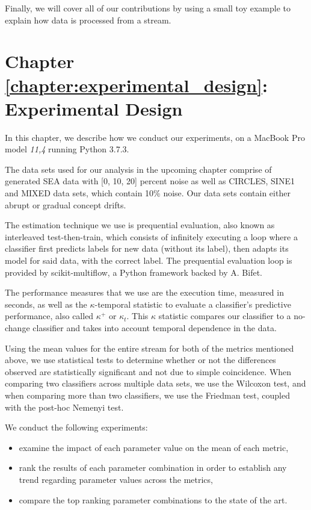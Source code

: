 Finally, we will cover all of our contributions by using a small toy example to explain how data is processed from a stream.

\section{Chapter \ref{chapter:experimental_design}: Experimental Design}
In this chapter, we describe how we conduct our experiments, on a MacBook Pro model \textit{11,4} running Python 3.7.3.

The data sets used for our analysis in the upcoming chapter comprise of generated SEA data with [0, 10, 20] percent noise as well as CIRCLES, SINE1 and MIXED data sets, which contain 10\% noise. Our data sets contain either abrupt or gradual concept drifts.

The estimation technique we use is prequential evaluation, also known as interleaved test-then-train, which consists of infinitely executing a loop where a classifier first predicts labels for new data (without its label), then adapts its model for said data, with the correct label. The prequential evaluation loop is provided by scikit-multiflow, a Python framework backed by A. Bifet.

The performance measures that we use are the execution time, measured in seconds, as well as the $\kappa$-temporal statistic to evaluate a classifier's predictive performance, also called $\kappa^+$ or $\kappa_t$. This $\kappa$ statistic compares our classifier to a no-change classifier and takes into account temporal dependence in the data.

Using the mean values for the entire stream for both of the metrics mentioned above, we use statistical tests to determine whether or not the differences observed are statistically significant and not due to simple coincidence. When comparing two classifiers across multiple data sets, we use the Wilcoxon test, and when comparing more than two classifiers, we use the Friedman test, coupled with the post-hoc Nemenyi test.

We conduct the following experiments:
\begin{itemize}
\item  examine the impact of each parameter value on the mean of each metric,
\item rank the results of each parameter combination in order to establish any trend regarding parameter values across the metrics,
\item compare the top ranking parameter combinations to the state of the art.
\end{itemize}

